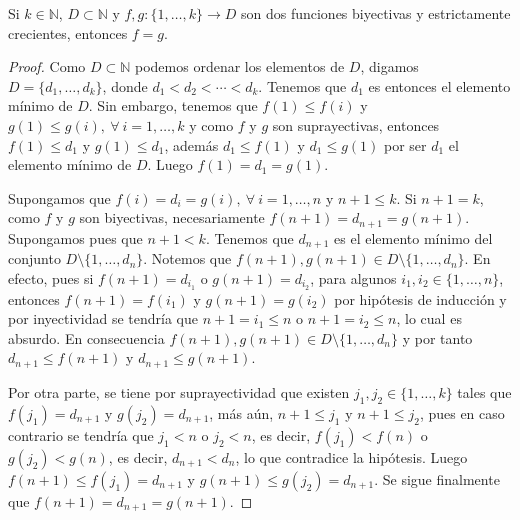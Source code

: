 \begin{lemma}
Si $k\in\mathbb{N}$, $D\subset \mathbb{N}$ y $f,g: \{1,\ldots,k\} \longrightarrow D$ son dos funciones biyectivas y estrictamente crecientes, entonces $f=g$.
\end{lemma}
\begin{proof}
Como $D\subset \mathbb{N}$ podemos ordenar los elementos de $D$, digamos $D=\{d_1,\ldots,d_k\}$, donde $d_1<d_2<\cdots<d_k$. Tenemos que $d_1$ es entonces el elemento mínimo de $D$. Sin embargo, tenemos que $f(1)\leq f(i)$ y $g(1)\leq g(i),\:\forall \: i=1,\ldots,k$ y como $f$ y $g$ son suprayectivas, entonces $f(1)\leq d_1$ y $g(1)\leq d_1$, además $d_1\leq f(1)$ y $d_1\leq g(1)$ por ser $d_1$ el elemento mínimo de $D$. Luego $f(1)=d_1=g(1)$.
\bigskip


Supongamos que $f(i)=d_i=g(i),\:\forall \: i=1,\ldots,n$ y $n+1\leq k$. Si $n+1=k$, como $f$ y $g$ son biyectivas, necesariamente $f(n+1)=d_{n+1}=g(n+1)$. Supongamos pues que $n+1<k$. Tenemos que $d_{n+1}$ es el elemento mínimo del conjunto $D \setminus \{1,\ldots,d_n\}$. Notemos que $f(n+1),g(n+1)\in D\setminus \{1,\ldots,d_n\}$. En efecto, pues si $f(n+1)=d_{i_1}$ o $g(n+1)=d_{i_2}$, para algunos $i_1,i_2\in \{1,\ldots,n\}$, entonces $f(n+1)=f(i_1)$ y $g(n+1)=g(i_2)$ por hipótesis de inducción y por inyectividad se tendría que $n+1=i_1\leq n$ o $n+1=i_2\leq n$, lo cual es absurdo. En consecuencia $f(n+1),g(n+1)\in D \setminus \{1,\ldots,d_n\}$ y por tanto $d_{n+1}\leq f(n+1)$ y $d_{n+1}\leq g(n+1)$. 
\bigskip

Por otra parte, se tiene por suprayectividad que existen $j_1,j_2\in \{1,\ldots,k\}$ tales que $f(j_1)=d_{n+1}$ y $g(j_2)=d_{n+1}$, más aún, $n+1\leq j_1$ y $n+1\leq j_2$, pues en caso contrario se tendría que $j_1<n$ o $j_2<n$, es decir, $f(j_1)<f(n)$ o $g(j_2)<g(n)$, es decir, $d_{n+1}<d_n$, lo que contradice la hipótesis. Luego $f(n+1)\leq f(j_1)=d_{n+1}$ y $g(n+1)\leq g(j_2)=d_{n+1}$. Se sigue finalmente que $f(n+1)=d_{n+1}=g(n+1)$.
\end{proof}

